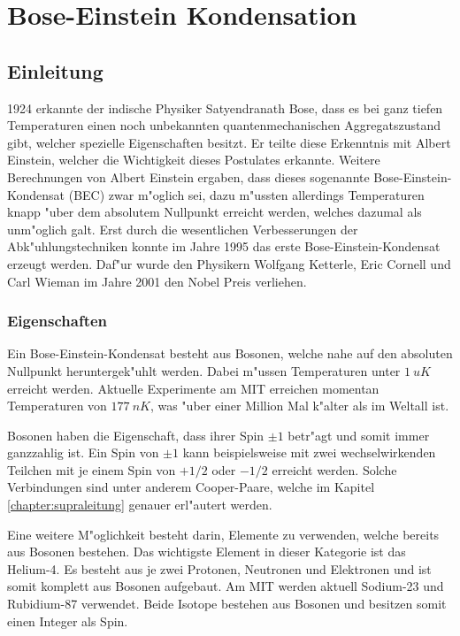 \chapter{Bose-Einstein Kondensation\label{chapter:bose}}
\begin{refsection}

\section{Einleitung}
1924 erkannte der indische Physiker Satyendranath Bose, dass es bei ganz tiefen Temperaturen einen noch unbekannten quantenmechanischen Aggregatszustand gibt, welcher spezielle Eigenschaften besitzt. Er teilte diese Erkenntnis mit Albert Einstein,  welcher die Wichtigkeit dieses Postulates erkannte. Weitere Berechnungen von Albert Einstein ergaben, dass dieses sogenannte Bose-Einstein-Kondensat (BEC) zwar m"oglich sei, dazu m"ussten allerdings Temperaturen knapp "uber dem absolutem Nullpunkt erreicht werden, welches dazumal als unm"oglich galt. Erst durch die wesentlichen Verbesserungen der Abk"uhlungstechniken konnte im Jahre 1995 das erste Bose-Einstein-Kondensat erzeugt werden. Daf"ur wurde den Physikern Wolfgang Ketterle, Eric Cornell und Carl Wieman im Jahre 2001 den Nobel Preis verliehen. 

\subsection{Eigenschaften}
Ein Bose-Einstein-Kondensat besteht aus Bosonen, welche nahe auf den absoluten Nullpunkt heruntergek"uhlt werden. Dabei m"ussen Temperaturen unter $1~uK$ erreicht werden. Aktuelle Experimente am MIT  erreichen momentan Temperaturen von $177~nK$, was "uber einer Million Mal k"alter als im Weltall ist.
 
Bosonen haben die Eigenschaft, dass ihrer Spin $\pm 1$ betr"agt und somit immer ganzzahlig ist. Ein Spin von $\pm 1$ kann beispielsweise mit zwei wechselwirkenden Teilchen mit je einem Spin von $+1/2$ oder $-1/2$ erreicht werden. Solche Verbindungen sind unter anderem Cooper-Paare, welche im Kapitel \ref{chapter:supraleitung} genauer erl"autert werden. 

Eine weitere M"oglichkeit besteht darin, Elemente zu verwenden, welche bereits aus Bosonen bestehen. Das wichtigste Element in dieser Kategorie ist das Helium-4. Es besteht aus je zwei Protonen, Neutronen und Elektronen und ist somit komplett aus Bosonen aufgebaut. Am MIT werden aktuell Sodium-23 und Rubidium-87 verwendet. Beide Isotope bestehen aus Bosonen und besitzen somit einen Integer als Spin.


\end{refsection}
